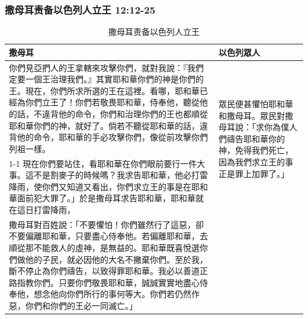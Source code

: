 \subsubsection{撒母耳责备以色列人立王 12:12-25} 
\begin{table}[H]
\centering 
\begin{tabular}{p{}|p{}}\hline\hline
撒母耳&以色列眾人\\\hline
你們見亞捫人的王拿轄來攻擊你們，就對我說：『我們定要一個王治理我們。』其實耶和華你們的神是你們的王。現在，你們所求所選的王在這裡。看哪，耶和華已經為你們立王了！你們若敬畏耶和華，侍奉他，聽從他的話，不違背他的命令，你們和治理你們的王也都順從耶和華你們的神，就好了。倘若不聽從耶和華的話，違背他的命令，耶和華的手必攻擊你們，像從前攻擊你們列祖一樣。&\multirow{2}{3.2cm}{眾民便甚懼怕耶和華和撒母耳。眾民對撒母耳說：「求你為僕人們禱告耶和華你的神，免得我們死亡，因為我們求立王的事正是罪上加罪了。」} \\\cline{1-1}
現在你們要站住，看耶和華在你們眼前要行一件大事。這不是割麥子的時候嗎？我求告耶和華，他必打雷降雨，使你們又知道又看出，你們求立王的事是在耶和華面前犯大罪了。」於是撒母耳求告耶和華，耶和華就在這日打雷降雨，&\\\hline
撒母耳對百姓說：「不要懼怕！你們雖然行了這惡，卻不要偏離耶和華，只要盡心侍奉他。若偏離耶和華，去順從那不能救人的虛神，是無益的。耶和華既喜悅選你們做他的子民，就必因他的大名不撇棄你們。至於我，斷不停止為你們禱告，以致得罪耶和華。我必以善道正路指教你們。只要你們敬畏耶和華，誠誠實實地盡心侍奉他，想念他向你們所行的事何等大。你們若仍然作惡，你們和你們的王必一同滅亡。」&\\\hline
\end{tabular}
\caption{撒母耳责备以色列人立王}
\end{table}



